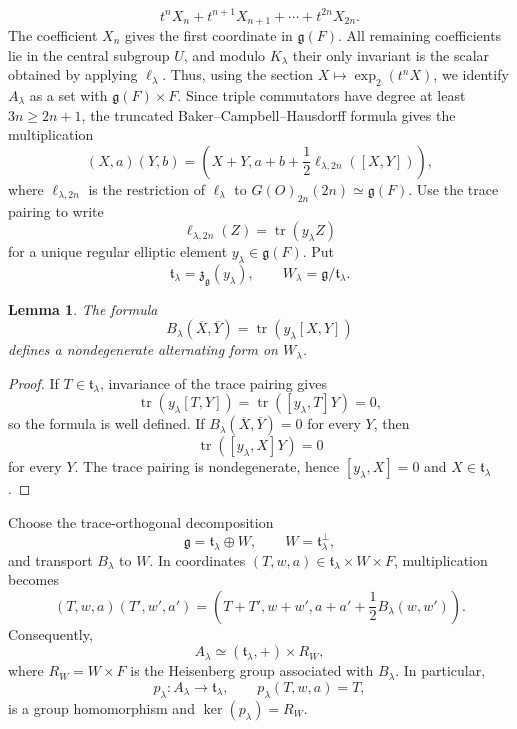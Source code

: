 \documentclass[11pt,a4paper,twoside]{amsart}
\newtheorem{lemma}[theorem]{Lemma}
\theoremstyle{definition}
\theoremstyle{remark}
\newcommand{\tori}{\mathfrak t}
\newcommand{\bl}{\lambda}
\newcommand{\fg}{\mathfrak g}
\begin{document}
$$
t^nX_n+t^{n+1}X_{n+1}+\cdots+t^{2n}X_{2n}.
$$
The coefficient $X_n$ gives the first coordinate in $\fg(F)$. All remaining coefficients lie in the central subgroup $U$, and modulo $K_\bl$ their only invariant is the scalar obtained by applying $\ell_\bl$. Thus, using the section $X\mapsto\exp_2(t^nX)$, we identify $A_\bl$ as a set with $\fg(F)\times F$. Since triple commutators have degree at least $3n\geq2n+1$, the truncated Baker--Campbell--Hausdorff formula gives the multiplication
$$
(X,a)(Y,b)=\left(X+Y,a+b+\frac12\ell_{\bl,2n}([X,Y])\right),
$$
where $\ell_{\bl,2n}$ is the restriction of $\ell_\bl$ to $G(O)_{2n}(2n)\simeq\fg(F)$.
Use the trace pairing to write
$$
\ell_{\bl,2n}(Z)=\operatorname{tr}(y_\bl Z)
$$
for a unique regular elliptic element $y_\bl\in\fg(F)$. Put
$$
\tori_\bl=\mathfrak z_\fg(y_\bl),
\qquad
W_\bl=\fg/\tori_\bl.
$$
\begin{lemma}\label{B-symplectic}
The formula
$$
B_\bl(\overline X,\overline Y)=\operatorname{tr}(y_\bl[X,Y])
$$
defines a nondegenerate alternating form on $W_\bl$.
\end{lemma}
\begin{proof}
If $T\in\tori_\bl$, invariance of the trace pairing gives
$$
\operatorname{tr}(y_\bl[T,Y])=\operatorname{tr}([y_\bl,T]Y)=0,
$$
so the formula is well defined. If $B_\bl(\overline X,\overline Y)=0$ for every $Y$, then
$$
\operatorname{tr}([y_\bl,X]Y)=0
$$
for every $Y$. The trace pairing is nondegenerate, hence $[y_\bl,X]=0$ and $X\in\tori_\bl$.
\end{proof}
Choose the trace-orthogonal decomposition
$$
\fg=\tori_\bl\oplus W,
\qquad W=\tori_\bl^\perp,
$$
and transport $B_\bl$ to $W$. In coordinates $(T,w,a)\in\tori_\bl\times W\times F$, multiplication becomes
$$
(T,w,a)(T',w',a')=
\left(T+T',w+w',a+a'+\frac12B_\bl(w,w')\right).
$$
Consequently,
$$
A_\bl\simeq(\tori_\bl,+)\times R_W,
$$
where $R_W=W\times F$ is the Heisenberg group associated with $B_\bl$. In particular,
$$
p_\bl:A_\bl\longrightarrow\tori_\bl,
\qquad
p_\bl(T,w,a)=T,
$$
is a group homomorphism and $\ker(p_\bl)=R_W$.
\end{document}
